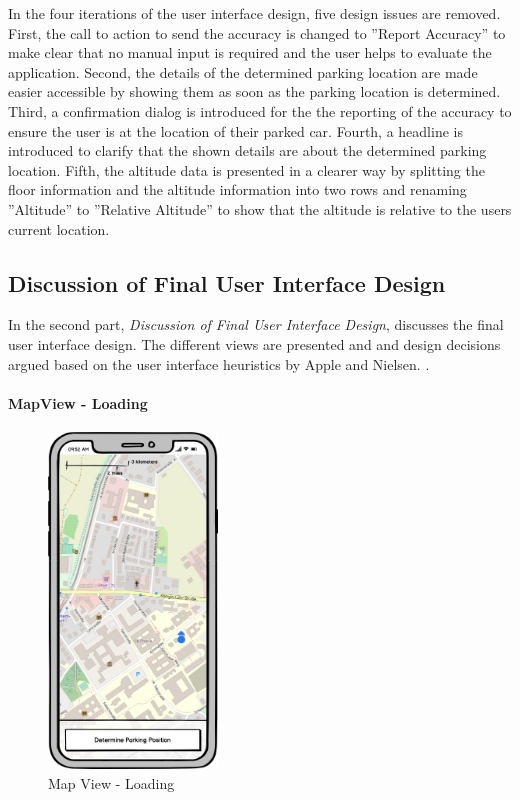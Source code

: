 In the four iterations of the user interface design, five design issues are removed. First, the call to action to send the accuracy is changed to ''Report Accuracy'' to make clear that no manual input is required and the user helps to evaluate the application. Second, the details of the determined parking location are made easier accessible by showing them as soon as the parking location is determined. Third, a confirmation dialog is introduced for the the reporting of the accuracy to ensure the user is at the location of their parked car. Fourth, a headline is introduced to clarify that the shown details are about the determined parking location. Fifth, the altitude data is presented in a clearer way by splitting the floor information and the altitude information into two rows and renaming ''Altitude'' to ''Relative Altitude'' to show that the altitude is relative to the users current location.


\subsection{Discussion of Final User Interface Design}

In the second part, \textit{Discussion of Final User Interface Design}, discusses the final user interface design. The different views are presented and and design decisions argued based on the user interface heuristics by Apple and Nielsen. \cite{nielsen1994usability} \cite{apple:interfaceguidliines}.

\paragraph{MapView - Loading}

\begin{figure}[h]
    \centering
    \includegraphics[width=0.4\textwidth]{images/UI/Iteration4-MapView-Loading.png}
    \caption{Map View - Loading}
    \label{fig:mv-loading}
\end{figure}

